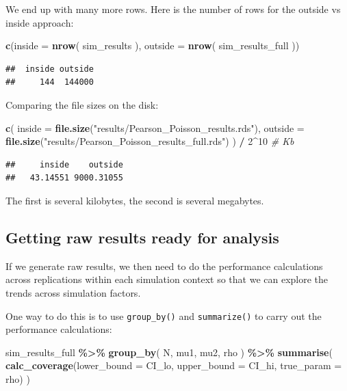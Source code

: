 \documentclass[
]{book}
\newenvironment{Shaded}{\begin{snugshade}}{\end{snugshade}}
\newcommand{\AttributeTok}[1]{\textcolor[rgb]{0.13,0.29,0.53}{#1}}
\newcommand{\CommentTok}[1]{\textcolor[rgb]{0.56,0.35,0.01}{\textit{#1}}}
\newcommand{\DecValTok}[1]{\textcolor[rgb]{0.00,0.00,0.81}{#1}}
\newcommand{\FunctionTok}[1]{\textcolor[rgb]{0.13,0.29,0.53}{\textbf{#1}}}
\newcommand{\NormalTok}[1]{#1}
\newcommand{\SpecialCharTok}[1]{\textcolor[rgb]{0.81,0.36,0.00}{\textbf{#1}}}
\newcommand{\StringTok}[1]{\textcolor[rgb]{0.31,0.60,0.02}{#1}}
\begin{document}
We end up with many more rows.
Here is the number of rows for the outside vs inside approach:

\begin{Shaded}
\begin{Highlighting}[]
\FunctionTok{c}\NormalTok{(}\AttributeTok{inside =} \FunctionTok{nrow}\NormalTok{( sim\_results ), }\AttributeTok{outside =} \FunctionTok{nrow}\NormalTok{( sim\_results\_full ))}
\end{Highlighting}
\end{Shaded}

\begin{verbatim}
##  inside outside 
##     144  144000
\end{verbatim}

Comparing the file sizes on the disk:

\begin{Shaded}
\begin{Highlighting}[]
\FunctionTok{c}\NormalTok{(}
  \AttributeTok{inside =} \FunctionTok{file.size}\NormalTok{(}\StringTok{"results/Pearson\_Poisson\_results.rds"}\NormalTok{),}
  \AttributeTok{outside =} \FunctionTok{file.size}\NormalTok{(}\StringTok{"results/Pearson\_Poisson\_results\_full.rds"}\NormalTok{)}
\NormalTok{) }\SpecialCharTok{/} \DecValTok{2}\SpecialCharTok{\^{}}\DecValTok{10} \CommentTok{\# Kb}
\end{Highlighting}
\end{Shaded}

\begin{verbatim}
##     inside    outside 
##   43.14551 9000.31055
\end{verbatim}

The first is several kilobytes, the second is several megabytes.

\subsection{Getting raw results ready for analysis}\label{getting-raw-results-ready-for-analysis}

If we generate raw results, we then need to do the performance calculations across replications within each simulation context so that we can explore the trends across simulation factors.

One way to do this is to use \texttt{group\_by()} and \texttt{summarize()} to carry out the performance calculations:

\begin{Shaded}
\begin{Highlighting}[]
\NormalTok{sim\_results\_full }\SpecialCharTok{\%\textgreater{}\%}
  \FunctionTok{group\_by}\NormalTok{( N, mu1, mu2, rho ) }\SpecialCharTok{\%\textgreater{}\%}
  \FunctionTok{summarise}\NormalTok{( }
    \FunctionTok{calc\_coverage}\NormalTok{(}\AttributeTok{lower\_bound =}\NormalTok{ CI\_lo, }\AttributeTok{upper\_bound =}\NormalTok{ CI\_hi, }\AttributeTok{true\_param =}\NormalTok{ rho)}
\NormalTok{  )}
\end{Highlighting}
\end{Shaded}
\end{document}
